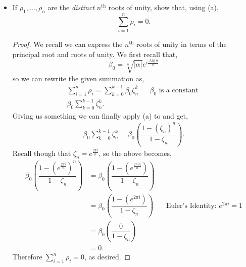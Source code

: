 \documentclass[11pt]{article}
\newenvironment{problem}[2][Problem\!]{\begin{trivlist}
\item[\hskip \labelsep {\bfseries #1}\hskip \labelsep {\bfseries #2}]}{\end{trivlist}}
\newcommand{\abs}[1]{\left\lvert#1\right\rvert} %
\newcommand{\parg}{\operatorname{Arg}}
\newcommand{\lrp}[1]{\left(#1\right)}
\begin{document}
\begin{problem}{2.2}
\begin{itemize}[itemsep=3em]
\begin{example}
\begin{proof}
    \end{proof}
\end{example}
\newpage
\item[(b)] If $\rho_1,\ldots,\rho_n$ are the \emph{distinct} $n^{\text{th}}$ roots of unity, show that, using (a), \[\sum_{i=1}^n \rho_i = 0.\]
\begin{example}
    \begin{proof}
        We recall we can express the $n^{\text{th}}$ roots of unity in terms of the principal root and roots of unity. We first recall that,
        \[\beta_0 = \sqrt[n]{\abs{\alpha}} e^{i\frac{\parg \alpha}{n }}\]
        so we can rewrite the given summation as, 
        \begin{align*}
            \sum_{i=1}^n \rho_i = \sum_{k = 0}^{k- 1} \beta_0 \zeta_n^{k} && \beta_0 \text{ is a constant } \\
            \beta_0 \sum_{k = 0}^{k-1}\zeta_n^{k}.
        \end{align*}
        Giving us something we can finally apply (a) to and get,
        \begin{align*}
            \beta_0 \sum_{k = 0}^{k-1}\zeta_n^{k} = \beta_0 \lrp{\dfrac{1 - (\zeta_n)^{n}}{1-\zeta_n}}.
        \end{align*}
        Recall though that $\zeta_n = e^{\frac{2\pi i }{n}}$, so the above becomes,
        \begin{align*}
            \beta_0 \lrp{\dfrac{1 - (e^{\frac{2\pi i }{n}})^{n}}{1 - \zeta_n}} &= \beta_0 \lrp{\dfrac{1 - (e^{\frac{2\pi  i n  }{n}})}{1 - \zeta_n}} \\
            &= \beta_0 \lrp{\dfrac{1 - (e^{2\pi  i   })}{1 - \zeta_n}} && \text{Euler's Identity: } e^{2\pi i } = 1 \\
            &= \beta_0 \lrp{\dfrac{0}{1 - \zeta_n}} \\
            &= 0.
        \end{align*}
        Therefore $\sum_{i=1}^n \rho_i = 0$, as desired. 
    \end{proof}
\end{example}


\end{itemize}
\end{problem}
\end{document}
